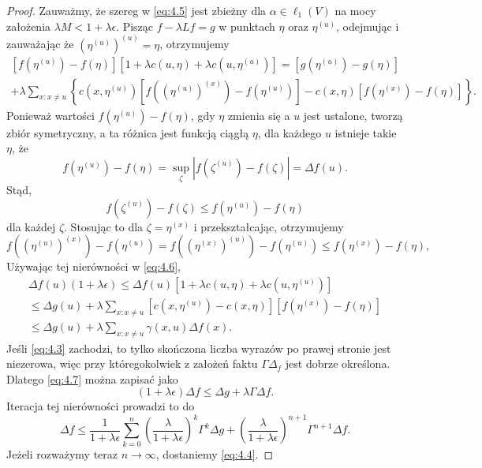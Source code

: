 \documentclass{article}
\begin{document}
\begin{proof}
	Zauważmy, że szereg w \eqref{eq:4.5} jest zbieżny dla $\alpha \in \ell_1(V)$ 
	na mocy założenia $\lambda M < 1 + \lambda \epsilon$. 
	Pisząc $f - \lambda Lf = g$ w punktach $\eta$ oraz $\eta^{(u)}$, odejmując i
	zauważając że $(\eta^{(u)})^{(u)} = \eta$, otrzymujemy
	\begin{multline}\label{eq:4.6}
		[f(\eta^{(u)}) - f(\eta)][1 + \lambda c(u, \eta) + \lambda c(u, \eta^{(u)})] 
		= [g(\eta^{(u)}) - g(\eta)]\\
		+ \lambda \sum_{x:x \neq u} \left\{ c(x, \eta^{(u)}) [f((\eta^{(u)})^{(x)}) 
		- f(\eta^{(u)})] - c(x, \eta)[f(\eta^{(x)}) - f(\eta)] \right\}.
	\end{multline}
	Ponieważ wartości $f(\eta^{(u)}) - f(\eta)$, gdy $\eta$ zmienia się a $u$ jest ustalone, 
	tworzą zbiór symetryczny, a ta różnica jest funkcją ciągłą $\eta$, 
	dla każdego $u$ istnieje takie $\eta$, że
	\[
		f(\eta^{(u)}) - f(\eta) = \sup_{\zeta} |f(\zeta^{(u)}) - f(\zeta)| = \Delta f(u).
	\]
	Stąd,
	\[
		f(\zeta^{(u)}) - f(\zeta) \leq f(\eta^{(u)}) - f(\eta)
	\]
	dla każdej $\zeta$. Stosując to dla $\zeta = \eta^{(x)}$ i przekształcając, otrzymujemy
	\[
		f((\eta^{(u)})^{(x)}) - f(\eta^{(u)}) 
		= f((\eta^{(x)})^{(u)}) - f(\eta^{(u)}) \leq f(\eta^{(x)}) - f(\eta),
	\]
	Używając tej nierówności w \eqref{eq:4.6},
	\begin{multline}\label{eq:4.7}
		\Delta f(u)(1 + \lambda \epsilon) \leq 
		\Delta f(u)[1 + \lambda c(u, \eta) + \lambda c(u, \eta^{(u)})] \\
		\leq \Delta g(u) + \lambda \sum_{x:x \neq u} 
		\left[ c(x, \eta^{(u)}) - c(x, \eta) \right] [f(\eta^{(x)}) - f(\eta)]
		\\ \leq \Delta g(u) + \lambda \sum_{x:x \neq u} \gamma(x,u) \Delta f(x).
	\end{multline}
	Jeśli \eqref{eq:4.3} zachodzi, to tylko skończona liczba wyrazów po 
	prawej stronie jest niezerowa, więc przy któregokolwiek z założeń faktu
	$\Gamma \Delta_f$ jest dobrze określona.
	Dlatego \eqref{eq:4.7} można zapisać jako
	\[
		(1 + \lambda \epsilon) \Delta f \leq \Delta g + \lambda \Gamma \Delta f.
	\]
	Iteracja tej nierówności prowadzi to do
	\[
		\Delta f \leq \frac{1}{1 + \lambda \epsilon} 
		\sum_{k=0}^{n} \left( \frac{\lambda}{1 + \lambda \epsilon} \right)^k 
		\Gamma^k \Delta g + \left( \frac{\lambda}{1 + \lambda \epsilon} \right)^{n+1} 
		\Gamma^{n+1} \Delta f.
	\]
	Jeżeli rozważymy teraz $n \to \infty$, dostaniemy \eqref{eq:4.4}.
\end{proof}
\end{document}
